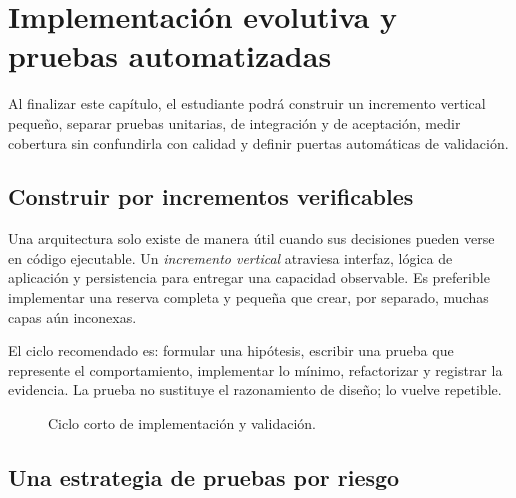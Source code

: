 \chapter{Implementación evolutiva y pruebas automatizadas}
\label{chap:implementacion}

\begin{objetivos}
Al finalizar este capítulo, el estudiante podrá construir un incremento vertical pequeño, separar pruebas unitarias, de integración y de aceptación, medir cobertura sin confundirla con calidad y definir puertas automáticas de validación.
\end{objetivos}

\section{Construir por incrementos verificables}

Una arquitectura solo existe de manera útil cuando sus decisiones pueden verse en código ejecutable. Un \emph{incremento vertical} atraviesa interfaz, lógica de aplicación y persistencia para entregar una capacidad observable. Es preferible implementar una reserva completa y pequeña que crear, por separado, muchas capas aún inconexas.

El ciclo recomendado es: formular una hipótesis, escribir una prueba que represente el comportamiento, implementar lo mínimo, refactorizar y registrar la evidencia. La prueba no sustituye el razonamiento de diseño; lo vuelve repetible.

\begin{figure}[htbp]
\centering
{}
\caption{Ciclo corto de implementación y validación.}
\end{figure}

\section{Una estrategia de pruebas por riesgo}

